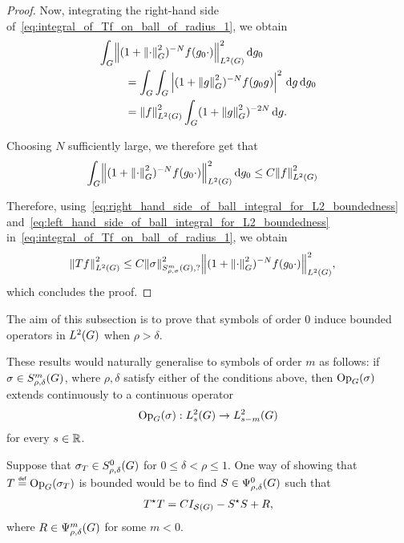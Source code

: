 \begin{proof}
    Now, integrating the right-hand side of~\eqref{eq:integral_of_Tf_on_ball_of_radius_1},
    we obtain
    \begin{align*}
        \int_\Group &\norm [\Lebesgue 2 \Group] {(1 + \norm [\Group] \dummy^2)^{-N} f(g_0 \dummy)}^2 \dd g_0\\
        &\quad = \int_\Group \int_\Group \abs{(1 + \norm [\Group] g^2)^{-N} f(g_0 g)}^2 \dd g \dd g_0\\
        &\quad = \norm [\Lebesgue 2 \Group] f^2 \int_\Group (1 + \norm [\Group] g^2)^{-2 N} \dd g.
    \end{align*}

    Choosing $N$ sufficiently large,
    we therefore get that
    \begin{align}
        \int_\Group &\norm [\Lebesgue 2 \Group] {(1 + \norm [\Group] \dummy^2)^{-N} f(g_0 \dummy)}^2 \dd g_0
        \leq C \norm [\Lebesgue 2 \Group] f^2
        \label{eq:right_hand_side_of_ball_integral_for_L2_boundedness}
    \end{align}

    Therefore,
    using~\eqref{eq:right_hand_side_of_ball_integral_for_L2_boundedness}
    and~\eqref{eq:left_hand_side_of_ball_integral_for_L2_boundedness}
    in~\eqref{eq:integral_of_Tf_on_ball_of_radius_1},
    we obtain
    \begin{align*}
        \norm [\Lebesgue 2 \Group] {T f}^2
        &\leq C \SymbolSemiNorm m {\rho, \sigma} ? \sigma^2
        \norm [\Lebesgue 2 \Group] {(1 + \norm [\Group] \dummy^2)^{-N} f(g_0 \dummy)}^2,
    \end{align*}
    which concludes the proof.
\end{proof}

The aim of this subsection is to prove
that symbols of order $0$ induce bounded operators in $\Lebesgue 2 \Group$
when $\rho > \delta$.

These results would naturally generalise to symbols of order $m$ as follows:
if $\sigma \in \SymbolClass m {\rho, \delta}$,
where $\rho, \delta$ satisfy either of the conditions above,
then $\Op(\sigma)$ extends continuously to a continuous operator
\begin{align*}
    \Op(\sigma) : \Sobolev s \to \Sobolev {s - m}
\end{align*}
for every $s \in \R$.

Suppose that $\sigma_T \in \SymbolClass 0 {\rho, \delta}$ for $0 \leq \delta < \rho \leq 1$.
One way of showing that $T \defeq \Op(\sigma_T)$ is bounded would be to find $S \in \OperatorClass 0 {\rho, \delta}$ such that
\begin{align}
    \adj T T = C \Id {\Schwartz \Group} - \adj S S + R,
    \label{eq:L2_boundedness_decomposition}
\end{align}
where $R \in \OperatorClass m {\rho, \delta}$ for some $m < 0$.

